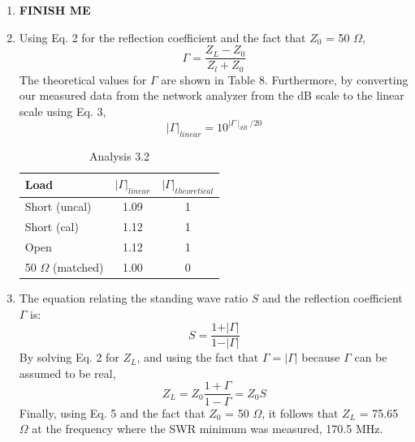 \documentclass{article}
\begin{document}
\begin{enumerate}
	\item \textbf{FINISH ME}
	
	\item Using Eq. 2 for the reflection coefficient and the fact that $Z_0$ = 50 $\Omega$,
	\begin{equation}
		\Gamma = \frac{Z_L-Z_0}{Z_l+Z_0}
	\end{equation}
	The theoretical values for $\Gamma$ are shown in Table 8. Furthermore, by converting our measured data from the network analyzer from the dB scale to the linear scale using Eq. 3,
	\begin{equation}
		\vert\Gamma\vert_{linear} = 10^{\mid\Gamma\mid_{dB}/20}
	\end{equation}
	
	\begin{table}[H]
	\centering
		\begin{tabular}{|l|c|c|}
		\hline
		\textbf{Load}     & $\vert\Gamma\vert_{linear}$ & $\vert\Gamma\vert_{theoretical}$ \\ \hline
		Short (uncal)         & 1.09      &    1      \\ \hline
		Short (cal)           & 1.12      &    1      \\ \hline
		Open                  & 1.12      &    1      \\ \hline
		50 $\Omega$ (matched) & 1.00  	 &    0      \\ \hline
		\end{tabular}
		\caption{Analysis 3.2}
		\label{}
	\end{table}	

	\item The equation relating the standing wave ratio $S$ and the reflection coefficient $\Gamma$ is:
	\begin{equation} 
		S = \frac{1 + \vert\Gamma\vert}{1 - \vert\Gamma\vert}
	\end{equation}
	By solving Eq. 2 for $Z_L$, and using the fact that $\Gamma = \vert\Gamma\vert$ because $\Gamma$ can be assumed to be real,
	\begin{equation}
		Z_L = Z_0\frac{1 + \Gamma}{1 - \Gamma} = Z_0 S
	\end{equation}	 
	Finally, using Eq. 5 and the fact that $Z_0$ = 50 $\Omega$, it follows that $Z_L$ = 75.65 $\Omega$ at the frequency where the SWR minimum was measured, 170.5 MHz.
\end{enumerate}
\end{document}
